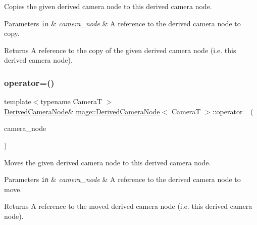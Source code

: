 Copies the given derived camera node to this derived camera node.


\begin{DoxyParams}[1]{Parameters}
\mbox{\tt in}  & {\em camera\+\_\+node} & A reference to the derived camera node to copy. \\
\hline
\end{DoxyParams}
\begin{DoxyReturn}{Returns}
A reference to the copy of the given derived camera node (i.\+e. this derived camera node). 
\end{DoxyReturn}
\hypertarget{classmage_1_1_derived_camera_node_a5faeff6f71a85b46d18f5b55e8dcf756}{}\label{classmage_1_1_derived_camera_node_a5faeff6f71a85b46d18f5b55e8dcf756} 
\subsubsection{\texorpdfstring{operator=()}{operator=()}\hspace{0.1cm}{\footnotesize\ttfamily [2/2]}}
{\footnotesize\ttfamily template$<$typename CameraT $>$ \\
\hyperlink{classmage_1_1_derived_camera_node}{Derived\+Camera\+Node}\& \hyperlink{classmage_1_1_derived_camera_node}{mage\+::\+Derived\+Camera\+Node}$<$ CameraT $>$\+::operator= (\begin{DoxyParamCaption}\item[{\hyperlink{classmage_1_1_derived_camera_node}{Derived\+Camera\+Node}$<$ CameraT $>$ \&\&}]{camera\+\_\+node }\end{DoxyParamCaption})\hspace{0.3cm}{\ttfamily [delete]}}

Moves the given derived camera node to this derived camera node.


\begin{DoxyParams}[1]{Parameters}
\mbox{\tt in}  & {\em camera\+\_\+node} & A reference to the derived camera node to move. \\
\hline
\end{DoxyParams}
\begin{DoxyReturn}{Returns}
A reference to the moved derived camera node (i.\+e. this derived camera node). 
\end{DoxyReturn}
